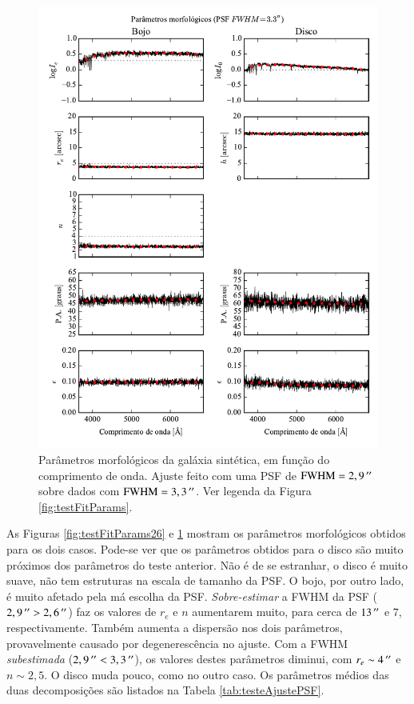 \begin{figure}
	\includegraphics{figuras/simulation_fitparams_psf33}
	\caption[Parâmetros morfológicos (teste com PSF $\mathrm{FWHM} =
	3,3\,\arcs$).] {Parâmetros morfológicos da galáxia sintética, em função do comprimento de
	onda. Ajuste feito com uma PSF de $\mathrm{FWHM} = 2,9\,^{\prime\prime}$ sobre
	dados com $\mathrm{FWHM} = 3,3\,\arcs$. Ver legenda da Figura
	\ref{fig:testFitParams}.}
	\label{fig:testFitParams33}
\end{figure}

As Figuras \ref{fig:testFitParams26} e \ref{fig:testFitParams33} mostram os
parâmetros morfológicos obtidos para os dois casos. Pode-se ver que os
parâmetros obtidos para o disco são muito próximos dos parâmetros do teste
anterior. Não é de se estranhar, o disco é muito suave, não tem estruturas na
escala de tamanho da PSF. O bojo, por outro lado, é muito afetado pela má
escolha da PSF. {\em Sobre-estimar} a FWHM da PSF ($2,9\,^{\prime\prime} > 2,6\,^{\prime\prime}$)
faz os valores de $r_e$ e $n$ aumentarem muito, para cerca de $13\,^{\prime\prime}$ e $7$,
respectivamente. Também aumenta a dispersão nos dois parâmetros, provavelmente
causado por degenerescência no ajuste. Com a FWHM {\em subestimada} ($2,9\,^{\prime\prime}
< 3,3\,^{\prime\prime}$), os valores destes parâmetros diminui, com $r_e \sim 4\,^{\prime\prime}$ e
$n \sim 2,5$. O disco muda pouco, como no outro caso. Os parâmetros médios das
duas decomposições são listados na Tabela \ref{tab:testeAjustePSF}.

